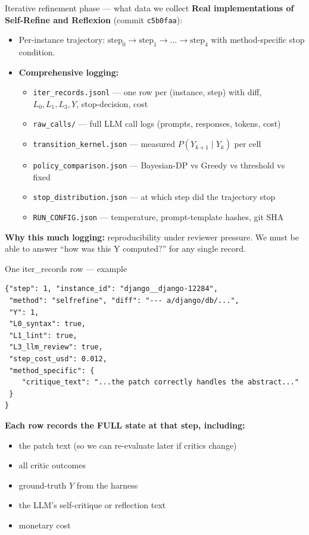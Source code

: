 \documentclass[10pt]{beamer}
\newcommand{\good}[1]{\textcolor{accentGreen}{\textbf{#1}}}
\newcommand{\warn}[1]{\textcolor{accentOrange}{\textbf{#1}}}
\newcommand{\info}[1]{\textcolor{primaryBlue}{\textbf{#1}}}
\begin{document}
\begin{frame}{Iterative refinement phase --- what data we collect}
\hypertarget{out:8}{}
\vspace{0.2cm}
\good{Real implementations of Self-Refine and Reflexion} (commit \texttt{c5b0faa}):
\begin{itemize}
\item Per-instance trajectory: $\text{step}_0 \to \text{step}_1 \to \dots \to
  \text{step}_4$ with method-specific stop condition.
\item \info{Comprehensive logging:}
  \begin{itemize}
  \item \texttt{iter\_records.jsonl} --- one row per (instance, step) with
    diff, $L_0, L_1, L_3, Y$, stop-decision, cost
  \item \texttt{raw\_calls/} --- full LLM call logs (prompts, responses,
    tokens, cost)
  \item \texttt{transition\_kernel.json} --- measured $P(Y_{k+1} \mid Y_k)$
    per cell
  \item \texttt{policy\_comparison.json} --- Bayesian-DP vs Greedy vs
    threshold vs fixed
  \item \texttt{stop\_distribution.json} --- at which step did the trajectory
    stop
  \item \texttt{RUN\_CONFIG.json} --- temperature, prompt-template hashes,
    git SHA
  \end{itemize}
\end{itemize}
\warn{Why this much logging:} reproducibility under reviewer pressure.
We must be able to answer ``how was this Y computed?'' for any single record.
\end{frame}

\begin{frame}[fragile]{One iter\_records row --- example}
\begin{lstlisting}[basicstyle=\ttfamily\scriptsize]
{"step": 1, "instance_id": "django__django-12284",
 "method": "selfrefine", "diff": "--- a/django/db/...",
 "Y": 1,
 "L0_syntax": true,
 "L1_lint": true,
 "L3_llm_review": true,
 "step_cost_usd": 0.012,
 "method_specific": {
    "critique_text": "...the patch correctly handles the abstract..."
 }
}
\end{lstlisting}
\info{Each row records the FULL state at that step, including:}
\begin{itemize}
\item the patch text (so we can re-evaluate later if critics change)
\item all critic outcomes
\item ground-truth $Y$ from the harness
\item the LLM's self-critique or reflection text
\item monetary cost
\end{itemize}
\end{frame}
\end{document}
